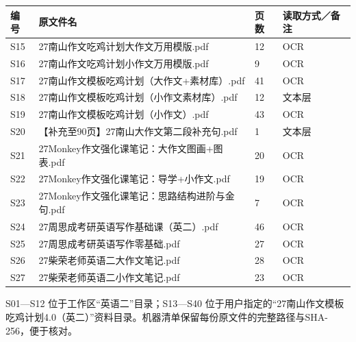 \documentclass[11pt,a4paper,fontset=macnew]{ctexart}
\begin{document}
\clearpage\par\vspace{4pt}{\bfseries 原文件索引 15—27}\par\nopagebreak
{\small
\begin{longtable}{L{13mm}L{104mm}L{11mm}L{25mm}}\toprule
\textbf{编号} & \textbf{原文件名} & \textbf{页数} & \textbf{读取方式／备注}\\\midrule\endhead
S15 & 27南山作文吃鸡计划大作文万用模版.pdf & 12 & OCR\\
S16 & 27南山作文吃鸡计划小作文万用模版.pdf & 9 & OCR\\
S17 & 27南山作文模板吃鸡计划（大作文+素材库）.pdf & 41 & OCR\\
S18 & 27南山作文模板吃鸡计划（小作文素材库）.pdf & 12 & 文本层\\
S19 & 27南山作文模板吃鸡计划（小作文）.pdf & 43 & OCR\\
S20 & 【补充至90页】27南山大作文第二段补充句.pdf & 1 & 文本层\\
S21 & 27Monkey作文强化课笔记：大作文图画+图表.pdf & 20 & OCR\\
S22 & 27Monkey作文强化课笔记：导学+小作文.pdf & 19 & OCR\\
S23 & 27Monkey作文强化课笔记：思路结构进阶与金句.pdf & 7 & OCR\\
S24 & 27周思成考研英语写作基础课（英二）.pdf & 46 & OCR\\
S25 & 27周思成考研英语写作零基础.pdf & 27 & OCR\\
S26 & 27柴荣老师英语二大作文笔记.pdf & 28 & OCR\\
S27 & 27柴荣老师英语二小作文笔记.pdf & 23 & OCR\\
\bottomrule\end{longtable}
}
S01—S12 位于工作区“英语二”目录；S13—S40 位于用户指定的“27南山作文模板吃鸡计划4.0（英二）”资料目录。机器清单保留每份原文件的完整路径与SHA-256，便于核对。
\end{document}
